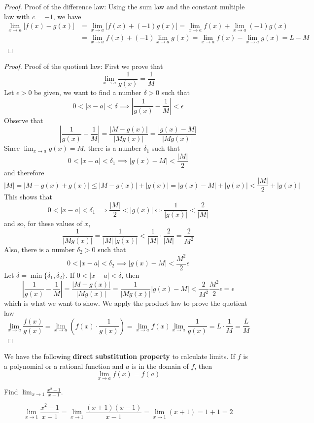 \begin{proof}
    Proof of the difference law:
    Using the sum law and the constant multiple law with \(c=-1\),
    we have
    \begin{align*}
        \lim_{x\to a}\bigl[f(x)-g(x)\bigr]
        &= \lim_{x\to a}\bigl[f(x)+(-1)g(x)\bigr]
        =\lim_{x\to a}f(x)+\lim_{x\to a}(-1)g(x) \\
        &=\lim_{x\to a}f(x)+(-1)\lim_{x\to a}g(x)
        =\lim_{x\to a}f(x)-\lim_{x\to a}g(x)=L-M
    \end{align*}
\end{proof}
\begin{proof}
    Proof of the quotient law:
    First we prove that \[\lim_{x\to a}\frac{1}{g(x)}=\frac{1}{M}\]
    Let \(\epsilon>0\) be given,
    we want to find a number \(\delta>0\) such that
    \[0<|x-a|<\delta\implies\left|\frac{1}{g(x)}-\frac{1}{M}\right|<\epsilon\]
    Observe that \[\left|\frac{1}{g(x)}-\frac{1}{M}\right|
    =\frac{|M-g(x)|}{|Mg(x)|}=\frac{|g(x)-M|}{|Mg(x)|}\]
    Since \(\displaystyle{\lim_{x\to a}g(x)=M}\),
    there is a number \(\delta_1\) such that
    \[0<|x-a|<\delta_1\implies|g(x)-M|<\frac{|M|}{2}\] and therefore
    \[|M|=|M-g(x)+g(x)|\leq|M-g(x)|+|g(x)|=|g(x)-M|+|g(x)|
    <\frac{|M|}{2}+|g(x)|\]
    This shows that
    \[0<|x-a|<\delta_1\implies\frac{|M|}{2}<|g(x)|\iff\frac{1}{|g(x)|}
    <\frac{2}{|M|}\]
    and so,
    for these values of \(x\),
    \[\frac{1}{|Mg(x)|}=\frac{1}{|M|\,|g(x)|}<\frac{1}{|M|}\cdot\frac{2}{|M|}
    =\frac{2}{M^2}\]
    Also,
    there is a number \(\delta_2>0\) such that
    \[0<|x-a|<\delta_2\implies|g(x)-M|<\frac{M^2}{2}\epsilon\]
    Let \(\delta=\min\{\delta_1,\delta_2\}\).
    If \(0<|x-a|<\delta\),
    then
    \[\left|\frac{1}{g(x)}-\frac{1}{M}\right|=\frac{|M-g(x)|}{|Mg(x)|}
    =\frac{1}{|Mg(x)|}|g(x)-M|<\frac{2}{M^2}\frac{M^2}{2}\epsilon=\epsilon\]
    which is what we want to show.
    We apply the product law to prove the quotient law
    \[\lim_{x\to a}\frac{f(x)}{g(x)}
    =\lim_{x\to a}\left(f(x)\cdot\frac{1}{g(x)}\right)
    =\lim_{x\to a}f(x)\lim_{x\to a}\frac{1}{g(x)}=L\cdot\frac{1}{M}
    =\frac{L}{M}\]
\end{proof}
We have the following \textbf{direct substitution property} to calculate
limits.
If \(f\) is a polynomial or a rational function and \(a\) is in the domain of
\(f\),
then
\[\lim_{x\to a}f(x)=f(a)\]
\begin{problem}
    Find \(\displaystyle{\lim_{x\to 1}\frac{x^2-1}{x-1}}\).
\end{problem}
\begin{solution}
    \[\lim_{x\to 1}\frac{x^2-1}{x-1}
    =\lim_{x\to 1}\frac{(x+1)(x-1)}{x-1}
    =\lim_{x\to 1}(x+1)=1+1=2\]
\end{solution}
